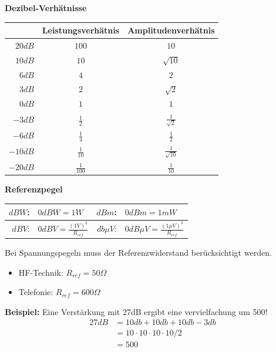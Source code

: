 \noindent\textbf{Dezibel-Verhätnisse}\\
\begin{table}[H]
	\begin{tabular}{r|c|c}
		& Leistungsverhätnis & Amplitudenverhätnis \\		\toprule
		$20dB$ & $100$ & $10$ \\ \midrule
		$10dB$ & $10$ & $\sqrt{10}$ \\\midrule
		$6dB$ & $4$ & $2$ \\\midrule
		$3dB$ & $2$ & $\sqrt{2}$ \\\midrule
		$0dB$ & $1$ & $1$ \\\midrule
		$-3dB$ & $\frac{1}{2}$ & $\frac{1}{\sqrt{2}}$ \\\midrule
		$-6dB$ & $\frac{1}{4}$ & $\frac{1}{2}$ \\\midrule
		$-10dB$ & $\frac{1}{10}$ & $\frac{1}{\sqrt{10}}$ \\\midrule
		$-20dB$ & $\frac{1}{100}$ & $\frac{1}{10}$ \\\midrule
	\end{tabular}
\end{table}
\noindent\textbf{Referenzpegel} 
\begin{table}[H]
	\begin{tabular}{rl || rl}
		$dBW$: & $0dBW = 1W$ & $dBm$: & $0dBm = 1mW$ \\ \midrule
		$dBV$: & $0dBV = \frac{(1V)^2}{R_{ref}}$& $db\mu V$: & $0dB\mu V = \frac{(1\mu V)^2}{R_{ref}}$ 
	\end{tabular}
\end{table}

\noindent Bei Spannungspegeln muss der Referenzwiderstand berücksichtigt werden.\\
\begin{itemize}[nosep]
	\item HF-Technik: $R_{ref} = 50 \Omega$
	\item Telefonie:  $R_{ref} = 600 \Omega$
\end{itemize}

\noindent\textbf{Beispiel:} Eine Verstärkung mit 27dB ergibt eine vervielfachung um 500!
\begin{align*}
	27dB &= 10db + 10db +10db - 3db \\
	&= 10 \cdot 10 \cdot 10 \cdot 10 / 2 \\
	&= 500
\end{align*}